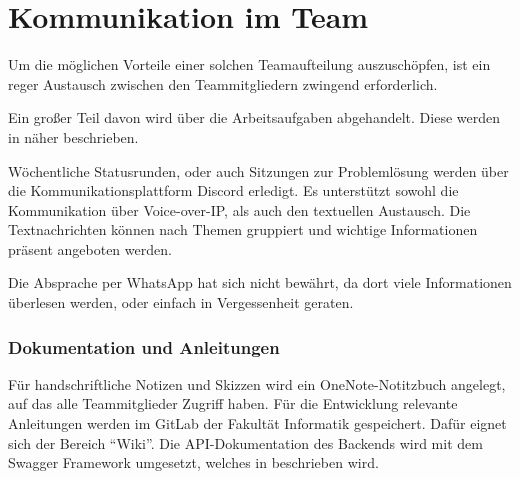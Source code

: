 
\section{Kommunikation im Team}

Um die möglichen Vorteile einer solchen Teamaufteilung auszuschöpfen, ist ein reger Austausch zwischen den Teammitgliedern zwingend erforderlich.

Ein großer Teil davon wird über die Arbeitsaufgaben abgehandelt. Diese werden in  näher beschrieben.

Wöchentliche Statusrunden, oder auch Sitzungen zur Problemlösung werden über die Kommunikationsplattform Discord erledigt. Es unterstützt sowohl die Kommunikation über Voice-over-IP, als auch den textuellen Austausch. Die Textnachrichten können nach Themen gruppiert und wichtige Informationen präsent angeboten werden.

Die Absprache per WhatsApp hat sich nicht bewährt, da dort viele Informationen überlesen werden, oder einfach in Vergessenheit geraten.

\subsubsection{Dokumentation und Anleitungen}

Für handschriftliche Notizen und Skizzen wird ein OneNote-Notitzbuch angelegt, auf das alle Teammitglieder Zugriff haben. Für die Entwicklung relevante Anleitungen werden im GitLab der Fakultät Informatik gespeichert. Dafür eignet sich der Bereich \enquote{Wiki}. Die API-Dokumentation des Backends wird mit dem Swagger Framework umgesetzt, welches in  beschrieben wird.
